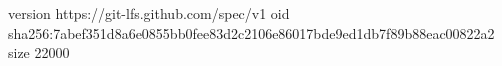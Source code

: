 version https://git-lfs.github.com/spec/v1
oid sha256:7abef351d8a6e0855bb0fee83d2c2106e86017bde9ed1db7f89b88eac00822a2
size 22000
